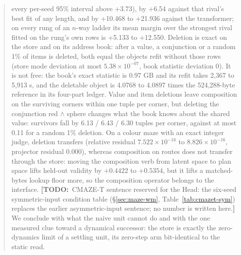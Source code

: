 \documentclass{article} %
\newcommand{\TODO}[1]{{\color{orange}\textbf{[TODO:}~#1\textbf{]}}}
\newcommand{\sci}[2]{\ensuremath{#1\times10^{#2}}}
\begin{document}
\begin{abstract}
every per-seed 95\% interval above +3.73), by +6.54 against that rival's best fit of any length, and
by +10.468 to +21.936 against the transformer; on every rung of an $n$-way ladder its mean margin
over the strongest rival fitted on the rung's own rows is +5.133 to +12.550.
Deletion is exact on the store and on its address book: after a value, a conjunction or a random
1\% of items is deleted, both equal the objects refit without those rows (store mode deviation at
most \sci{5.38}{-07}, book statistic deviation 0). It is not free: the book's exact statistic is %
0.97 GB and its refit takes 2,367 to 5,913 s, and the deletable object is 4.0768 to 4.0897 times %
the 524,288-byte reference in its four-part ledger. Value and item deletions leave composition on %
the surviving corners within one tuple per corner, but deleting the conjunction red $\wedge$ sphere
changes what the book knows about the shared value: survivors fall by 6.13 / 6.43 / 6.30 tuples per %
corner, against at most 0.11 for a random 1\% deletion. %
On a colour maze with an exact integer judge, deletion transfers
(relative residual \sci{7.522}{-16} to \sci{8.826}{-16}, projector residual 0.000), %
whereas composition on routes does not transfer through the store: moving the composition verb from
latent space to plan space lifts held-out validity by $+0.4422$ to $+0.5354$, but it lifts a matched-bytes lookup floor more, so the composition operator belongs to the interface.
\TODO{CMAZE-T sentence reserved for the Head: the six-seed symmetric-input condition table
(\S\ref{sec:maze-wm}, Table~\ref{tab:cmazet-sym}) replaces the earlier asymmetric-input sentence; no
number is written here.}
We conclude with what the naive unit cannot do and with the one measured clue toward a
dynamical successor: the store is exactly the zero-dynamics limit of a settling unit, its zero-step arm bit-identical to the static read. %
\end{abstract}
\end{document}
